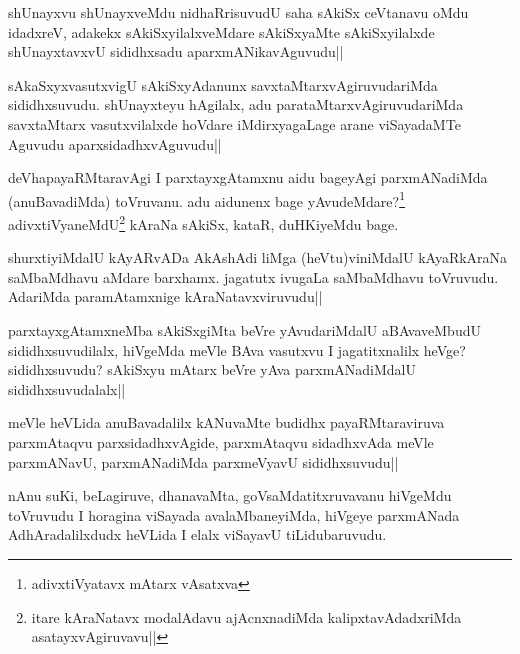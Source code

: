 
\begin{artha}
shUnayxvu shUnayxveMdu nidhaRrisuvudU saha sAkiSx ceVtanavu oMdu idadxreV, adakekx sAkiSxyilalxveMdare sAkiSxyaMte sAkiSxyilalxde shUnayxtavxvU sididhxsadu aparxmANikavAguvudu||
\end{artha}

\begin{artha}
sAkaSxyxvasutxvigU sAkiSxyAdanunx savxtaMtarxvAgiruvudariMda sididhxsuvudu. shUnayxteyu hAgilalx, adu parataMtarxvAgiruvudariMda savxtaMtarx vasutxvilalxde hoVdare iMdirxyagaLage arane viSayadaMTe Aguvudu aparxsidadhxvAguvudu||
\end{artha}

\begin{artha}
deVhapayaRMtaravAgi I parxtayxgAtamxnu aidu bageyAgi parxmANadiMda (anuBavadiMda) toVruvanu. adu aidunenx bage yAvudeMdare?\footnote[1]{adivxtiVyatavx mAtarx vAsatxva} adivxtiVyaneMdU\footnote[2]{itare kAraNatavx modalAdavu ajAcnxnadiMda kalipxtavAdadxriMda asatayxvAgiruvavu||} kAraNa sAkiSx, kataR, duHKiyeMdu bage.
\end{artha}


\begin{artha}
shurxtiyiMdalU kAyARvADa AkAshAdi liMga (heVtu)viniMdalU kAyaRkAraNa saMbaMdhavu aMdare barxhamx. jagatutx ivugaLa saMbaMdhavu toVruvudu. AdariMda paramAtamxnige kAraNatavxviruvudu||
\end{artha}

\begin{artha}
parxtayxgAtamxneMba sAkiSxgiMta beVre yAvudariMdalU aBAvaveMbudU sididhxsuvudilalx, hiVgeMda meVle BAva vasutxvu I jagatitxnalilx heVge? sididhxsuvudu? sAkiSxyu mAtarx beVre yAva parxmANadiMdalU sididhxsuvudalalx||
\end{artha}

\begin{artha}
meVle heVLida anuBavadalilx kANuvaMte budidhx payaRMtaraviruva parxmAtaqvu parxsidadhxvAgide, parxmAtaqvu sidadhxvAda meVle parxmANavU, parxmANadiMda parxmeVyavU sididhxsuvudu||
\end{artha}


\begin{artha}
nAnu suKi, beLagiruve, dhanavaMta, goVsaMdatitxruvavanu hiVgeMdu toVruvudu I horagina viSayada avalaMbaneyiMda, hiVgeye parxmANada AdhAradalilxdudx heVLida I elalx viSayavU tiLidubaruvudu.
\end{artha}

